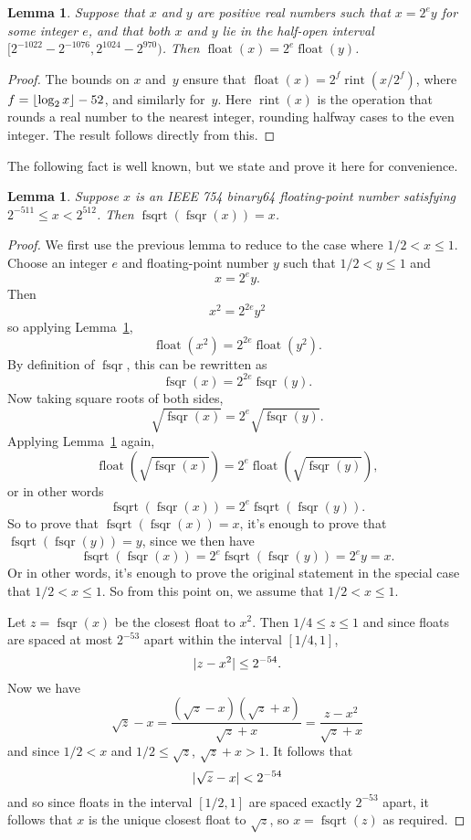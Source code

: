 \documentclass[a4paper]{article}
\DeclarePairedDelimiter\floor{\lfloor}{\rfloor}
\DeclarePairedDelimiter\abs{\lvert}{\rvert}
\DeclareMathOperator{\fsqrt}{fsqrt}
\DeclareMathOperator{\fsqr}{fsqr}
\DeclareMathOperator{\float}{float}
\DeclareMathOperator{\rint}{rint}
\theoremstyle{plain}
\newtheorem{lemma}[theorem]{Lemma}
\theoremstyle{definition}
\begin{document}
\begin{lemma}
  \label{float-scale}
  Suppose that $x$ and $y$ are positive real numbers such that $x = 2^e y$ for
  some integer $e$, and that both $x$ and $y$ lie in the half-open interval
  $[2^{-1022} - 2^{-1076}, 2^{1024} - 2^{970})$. Then $\float(x) = 2^e \float(y)$.
\end{lemma}

\begin{proof}
  The bounds on $x$ and~$y$ ensure that $\float(x) = 2^f \rint(x / 2^f)$, where
  $f = \floor{\log_2 x} - 52$, and similarly for~$y$. Here $\rint(x)$ is the
  operation that rounds a real number to the nearest integer, rounding halfway
  cases to the even integer. The result follows directly from this.
\end{proof}

The following fact is well known, but we state and prove it here for convenience.

\begin{lemma}
  Suppose $x$ is an IEEE 754 binary64 floating-point number satisfying
  $2^{-511} \le x < 2^{512}$. Then $\fsqrt(\fsqr(x)) = x$.
\end{lemma}

\begin{proof}
  We first use the previous lemma to reduce to the case where $1/2 < x \le 1$.
  Choose an integer $e$ and floating-point number $y$ such that $1/2 < y \le 1$
  and
  $$x = 2^e y.$$
  Then
  $$x^2 = 2^{2e}y^2$$
  so applying Lemma~\ref{float-scale},
  $$\float(x^2) = 2^{2e}\float(y^2).$$
  By definition of $\fsqr$, this can be rewritten as
  $$\fsqr(x) = 2^{2e}\fsqr(y).$$
  Now taking square roots of both sides,
  $$\sqrt{\fsqr(x)} = 2^e \sqrt{\fsqr(y)}.$$
  Applying Lemma~\ref{float-scale} again,
  $$\float(\sqrt{\fsqr(x)}) = 2^e \float(\sqrt{\fsqr(y)}),$$
  or in other words
  $$\fsqrt(\fsqr(x)) = 2^e \fsqrt(\fsqr(y)).$$
  So to prove that $\fsqrt(\fsqr(x)) = x$, it's enough to prove that
  $\fsqrt(\fsqr(y)) = y$, since we then have
  $$\fsqrt(\fsqr(x)) = 2^e \fsqrt(\fsqr(y)) = 2^e y = x.$$
  Or in other words, it's enough to prove the original statement in the special case that
  $1/2 < x \le 1$. So from this point on, we assume that $1/2 < x \le 1$.

  Let $z = \fsqr(x)$ be the closest float to $x^2$. Then $1/4 \le z \le 1$ and
  since floats are spaced at most $2^{-53}$ apart within the interval $[1/4,
  1]$,
  $$\abs{z - x^2} \le 2^{-54}.$$ Now we have
  $$\sqrt z - x = \frac{(\sqrt z - x)(\sqrt z + x)}{\sqrt z + x} = \frac{z -
  x^2}{\sqrt z + x}$$ and since $1/2 < x$ and $1/2 \le \sqrt z $, $\sqrt z + x
  > 1$. It follows that
  $$\abs{\sqrt z - x} < 2^{-54}$$ and so since floats in the interval $[1/2,
  1]$ are spaced exactly $2^{-53}$ apart, it follows that $x$ is the unique
  closest float to $\sqrt z$, so $x = \fsqrt(z)$ as required.
\end{proof}
\end{document}
